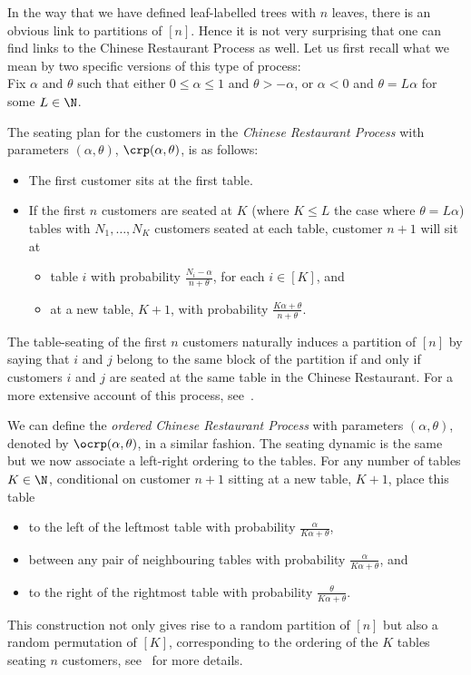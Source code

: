 %
In the way that we have defined leaf-labelled trees with $n$ leaves, there is an obvious link to partitions of $[n]$.
Hence it is not very surprising that one can find links to the Chinese Restaurant Process as well.
Let us first recall what we mean by two specific versions of this type of process: \\

Fix $\alpha$ and $\theta$ such that either $0 \leq \alpha \leq 1$ and $\theta > -\alpha$, or $\alpha < 0$ and $\theta = L\alpha$ for some $L \in \N$.

The seating plan for the customers in the \textit{Chinese Restaurant Process} with parameters $(\alpha, \theta)$, $\crp(\alpha,\theta)$, is as follows:
%
\begin{itemize}
  \item The first customer sits at the first table.
  \item If the first $n$ customers are seated at $K$ (where $K \leq L$ the case where $\theta = L\alpha$) tables with $N_1, \ldots, N_K$ customers seated at each table, customer $n+1$ will sit at
    \begin{itemize}
      \item table $i$ with probability $\frac{N_i - \alpha}{n + \theta}$, for each $i \in [K]$, and
      \item at a new table, $K+1$, with probability $\frac{K\alpha + \theta}{n + \theta}$.
    \end{itemize}
\end{itemize}
%
The table-seating of the first $n$ customers naturally induces a partition of $[n]$ by saying that $i$ and $j$ belong to the same block of the partition if and only if customers $i$ and $j$ are seated at the same table in the Chinese Restaurant.
For a more extensive account of this process, see~\cite{RefWorks:doc:5b644f76e4b0a3434e490fc8}.

We can define the \textit{ordered Chinese Restaurant Process} with parameters $(\alpha, \theta)$, denoted by $\ocrp(\alpha, \theta)$, in a similar fashion.
The seating dynamic is the same but we now associate a left-right ordering to the tables.
For any number of tables $K \in \N$, conditional on customer $n+1$ sitting at a new table, $K+1$, place this table
%
\begin{itemize}
  \item to the left of the leftmost table with probability $\frac{\alpha}{K\alpha + \theta}$,
  \item between any pair of neighbouring tables with probability $\frac{\alpha}{K\alpha + \theta}$, and
  \item to the right of the rightmost table with probability $\frac{\theta}{K\alpha + \theta}$.
\end{itemize}
%
This construction not only gives rise to a random partition of $[n]$ but also a random permutation of $[K]$, corresponding to the ordering of the $K$ tables seating $n$ customers, see~\cite{RefWorks:doc:5b6c5580e4b0a3935d3436d8} for more details. \\

